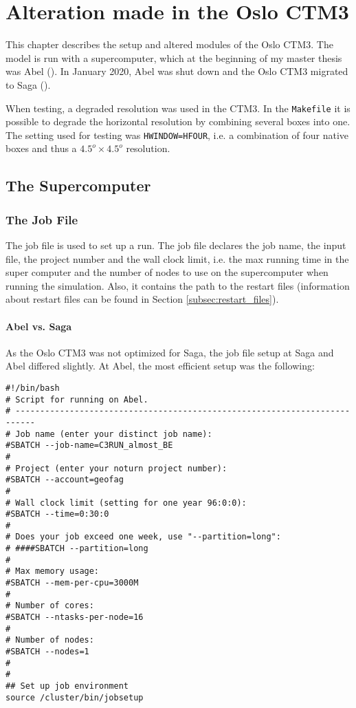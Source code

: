 \setcounter{chapter}{4}
\chapter{Alteration made in the Oslo CTM3}

This chapter describes the setup and altered modules of the Oslo CTM3. The model is run with a supercomputer, which at the beginning of my master thesis was Abel (\cite{abel}). In January 2020, Abel was shut down and the Oslo CTM3 migrated to Saga (\cite{saga}). 

\medskip

When testing, a degraded resolution was used in the CTM3. In the \texttt{Makefile} it is possible to degrade the horizontal resolution by combining several boxes into one. The setting used for testing was \texttt{HWINDOW=HFOUR}, i.e. a combination of four native boxes and thus a $4.5^o \times 4.5^o$ resolution. 



\section{The Supercomputer}

\subsection{The Job File}

The job file is used to set up a run. The job file declares the job name, the input file, the project number and the wall clock limit, i.e. the max running time in the super computer and the number of nodes to use on the supercomputer when running the simulation. Also, it contains the path to the restart files (information about restart files can be found in Section \ref{subsec:restart_files}).

\subsubsection{Abel vs. Saga}

As the Oslo CTM3 was not optimized for Saga, the job file setup at Saga and Abel differed slightly. At Abel, the most efficient setup was the following: 

\begin{lstlisting}
#!/bin/bash
# Script for running on Abel.
# --------------------------------------------------------------------------
# Job name (enter your distinct job name):
#SBATCH --job-name=C3RUN_almost_BE
#
# Project (enter your noturn project number):
#SBATCH --account=geofag
#
# Wall clock limit (setting for one year 96:0:0):
#SBATCH --time=0:30:0
#
# Does your job exceed one week, use "--partition=long":
# ####SBATCH --partition=long
#
# Max memory usage:
#SBATCH --mem-per-cpu=3000M
#
# Number of cores:
#SBATCH --ntasks-per-node=16
#
# Number of nodes:
#SBATCH --nodes=1
#
#
## Set up job environment
source /cluster/bin/jobsetup
\end{lstlisting}

